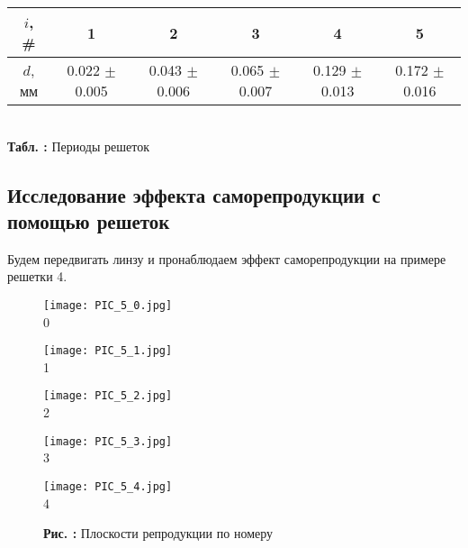 \documentclass[12pt,a4paper]{article}
\newcounter{picture}
\newcounter{tbl}
\newcommand{\embedtbl}[3]{\begin{center}
		\begin{tabular}{#1}
			#2
		\end{tabular}
		\\\textbf{Табл. \thetbl:} #3
		\label{tbl_\thetbl}
		\addtocounter{tbl}{1}
\end{center}}
\begin{document}
	\embedtbl{|c||c|c|c|c|c|}{
		\hline
		$i$, \# & 1 & 2 & 3 & 4 & 5
		\\\hline
		$d$, мм & 0.022 $\pm$ 0.005 & 0.043 $\pm$ 0.006 & 0.065 $\pm$ 0.007 & 0.129 $\pm$ 0.013 & 0.172 $\pm$ 0.016
		\\\hline
	}{Периоды решеток}
	
	\subsection{Исследование эффекта саморепродукции с помощью решеток}
	
	Будем передвигать линзу и пронаблюдаем эффект саморепродукции на примере решетки 4.
	
	\newpage
	
	\begin{figure}[h]
		\begin{minipage}{0.33\linewidth}
			\begin{center}
				\texttt{[image: PIC\_5\_0.jpg]}
				\\0
			\end{center}
		\end{minipage}
		\begin{minipage}{0.33\linewidth}
			\begin{center}
				\texttt{[image: PIC\_5\_1.jpg]}
				\\1
			\end{center}
		\end{minipage}
		\begin{minipage}{0.33\linewidth}
			\begin{center}
				\texttt{[image: PIC\_5\_2.jpg]}
				\\2
			\end{center}
		\end{minipage}
	\end{figure}
	\begin{figure}[h]
		\begin{minipage}{0.5\linewidth}
			\begin{center}
				\texttt{[image: PIC\_5\_3.jpg]}
				\\3
			\end{center}
		\end{minipage}
		\begin{minipage}{0.5\linewidth}
			\begin{center}
				\texttt{[image: PIC\_5\_4.jpg]}
				\\4
			\end{center}
		\end{minipage}
		\begin{center}
			\textbf{Рис. \thepicture:} Плоскости репродукции по номеру
			\label{pic_\thepicture}
			\addtocounter{picture}{1}
		\end{center}
	\end{figure}
	
\end{document}
